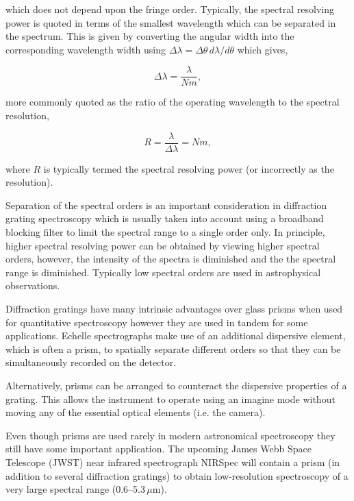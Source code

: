 \noident which does not depend upon the fringe order.
Typically, the spectral resolving power is quoted in terms of the smallest wavelength which can be separated in the spectrum.
This is given by converting the angular width into the corresponding wavelength width using $\Delta\lambda = \Delta\theta\,d\lambda/d\theta$ which gives,

\begin{equation}
    \Delta\lambda = \frac{\lambda}{Nm},\label{eq:f}
\end{equation}

\noindent more commonly quoted as the ratio of the operating wavelength to the spectral resolution,

\begin{equation}
    R = \frac{\lambda}{\Delta\lambda} = Nm,\label{eq:g}
\end{equation}

\noindent where $R$ is typically termed the spectral resolving power (or incorrectly as the resolution).

Separation of the spectral orders is an important consideration in diffraction grating spectroscopy which is usually taken into account using a broadband blocking filter to limit the spectral range to a single order only.
In principle, higher spectral resolving power can be obtained by viewing higher spectral orders, however, the intensity of the spectra is diminished and the the spectral range is diminished.
Typically low spectral orders are used in astrophysical observations.

Diffraction gratings have many intrinsic advantages over glass prisms when used for quantitative spectroscopy however they are used in tandem for some applications.
Echelle spectrographs make use of an additional dispersive element, which is often a prism, to spatially separate different orders so that they can be simultaneously recorded on the detector.

Alternatively, prisms can be arranged to counteract the dispersive properties of a grating.
This allows the instrument to operate using an imagine mode without moving any of the essential optical elements (i.e. the camera).

Even though prisms are used rarely in modern astronomical spectroscopy they still have some important application.
The upcoming James Webb Space Telescope (JWST) near infrared spectrograph NIRSpec will contain a prism (in addition to several diffraction gratings) to obtain low-resolution spectroscopy of a very large spectral range (0.6--5.3\,$\mu$m).

